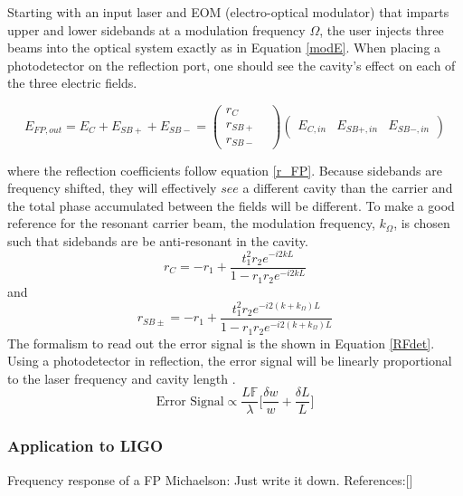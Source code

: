 		Starting with an input laser and EOM (electro-optical modulator) that imparts upper and lower sidebands at a modulation frequency $\Omega$, the user injects three beams into the optical system exactly as in Equation \ref{modE}.  When placing a photodetector on the reflection port, one should see the cavity's effect on each of the three electric fields.
		
		\begin{equation}
		E_{FP,out} = E_{C} + E_{SB+} + E_{SB-} = 
		\begin{pmatrix}
		r_{C} 	&   
		\\ 	r_{SB+} &
		\\ 	r_{SB-} &
		\end{pmatrix}
		\begin{pmatrix}
		E_{C,in} &    E_{SB+,in}    &  E_{SB-,in}     
		\end{pmatrix}
		\end{equation}
		
		where the reflection coefficients follow equation \ref{r_FP}.  Because sidebands are frequency shifted, they will effectively $see$ a different cavity than the carrier and the total phase accumulated between the fields will be different. To make a good reference for the resonant carrier beam, the modulation frequency, $k_{\Omega}$, is chosen such that sidebands are be anti-resonant in the cavity.  
		\begin{equation}
		r_{C} = -r_1 + \frac{t_1^2 r_2  e^{-i2kL}}{1-r_1 r_2 e^{-i2kL}}
		\end{equation}
		and 	
		\begin{equation}
		r_{SB\pm} = -r_1 + \frac{t_1^2 r_2  e^{-i2(k+k_{\Omega})L}}{1-r_1 r_2 e^{-i2(k+k_{\Omega})L}}
		\end{equation}
		The formalism to read out the error signal is the shown in Equation \ref{RFdet}. Using a photodetector in reflection, the error signal will be linearly proportional to the laser frequency and cavity length \cite{BlackPDH}.
		\begin{equation}
		\text{Error Signal} \propto \frac{L \mathbb{F}}{\lambda} \bigg[\frac{\delta w}{w} + \frac{\delta L}{L}\bigg]
		\end{equation}

		\subsubsection{Application to LIGO}
		
		Frequency response of a FP Michaelson:
		Just write it down.
		References:[\cite{BlackSignalExtraction}]

